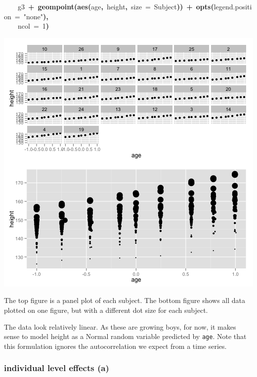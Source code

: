 \documentclass{article}
\makeatletter
\newcommand{\hlnumber}[1]{\textcolor[rgb]{0,0,0}{#1}}%
\newcommand{\hlfunctioncall}[1]{\textcolor[rgb]{.5,0,.33}{\textbf{#1}}}%
\newcommand{\hlstring}[1]{\textcolor[rgb]{.6,.6,1}{#1}}%
\newcommand{\hlkeyword}[1]{\textbf{#1}}%
\newcommand{\hlargument}[1]{\textcolor[rgb]{.69,.25,.02}{#1}}%
\newcommand{\hlsymbol}[1]{#1}%
\newcommand{\hlstd}[1]{\textcolor[rgb]{0,0,0}{#1}}%
\newenvironment{kframe}{%
 \def\FrameCommand##1{\hskip\@totalleftmargin \hskip-\fboxsep
 \colorbox{shadecolor}{##1}\hskip-\fboxsep
     \hskip-\linewidth \hskip-\@totalleftmargin \hskip\columnwidth}%
 \MakeFramed {\advance\hsize-\width
   \@totalleftmargin\z@ \linewidth\hsize
   \@setminipage}}%
 {\par\unskip\endMakeFramed}
\newenvironment{knitrout}{}{} %
\makeatother
\begin{document}
\begin{knitrout}
{\begin{kframe}
\begin{flushleft}
\hlstd{}{\ }{\ }{\ }{\ }\hlsymbol{g3}{\ }\hlkeyword{+}{\ }\hlfunctioncall{geom\usebox{\hlnormalsizeboxunderscore}point}\hlkeyword{(}\hlfunctioncall{aes}\hlkeyword{(}\hlsymbol{age}\hlkeyword{,}{\ }\hlsymbol{height}\hlkeyword{,}{\ }\hlargument{size}{\ }\hlargument{=}{\ }\hlsymbol{Subject}\hlkeyword{)}\hlkeyword{)}{\ }\hlkeyword{+}{\ }\hlfunctioncall{opts}\hlkeyword{(}\hlargument{legend.position}{\ }\hlargument{=}{\ }\hlstring{"none"}\hlkeyword{)}\hlkeyword{,}\hspace*{\fill}\\
\hlstd{}{\ }{\ }{\ }{\ }\hlargument{ncol}{\ }\hlargument{=}{\ }\hlnumber{1}\hlkeyword{)}\mbox{}
\normalfont
\end{flushleft}
\includegraphics{plot-ox} \end{kframe}}
\end{knitrout}


The top figure is a panel plot of each subject. 
The bottom figure shows all data plotted on one figure, but with a different dot size for each subject. 


The data look relatively linear. As these are growing boys, for now, it makes sense to model height as a Normal random variable predicted by {\tt age}. 
Note that this formulation ignores the autocorrelation we expect from a time series.

\subsubsection*{individual level effects (a)}
\end{document}
